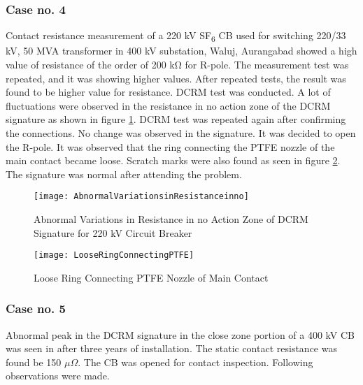 \subsubsection*{Case no. 4}
Contact resistance measurement of a 220 kV SF\textsubscript{6} CB used for switching 220/33 kV, 50 MVA transformer in 400 kV substation, Waluj, Aurangabad showed a high value of resistance of the order of 200 kΩ for R-pole. The measurement test was repeated, and it was showing higher values. After repeated tests, the result was found to be higher value for resistance. DCRM test was conducted. A lot of fluctuations were observed in the resistance in no action zone of the DCRM signature as shown in figure \ref{fig:Abnormal Variations in Resistance in no Action Zone of DCRM Signature for 220 kV Circuit Breaker}. DCRM test was repeated again after confirming the connections. No change was observed in the signature. It was decided to open the R-pole. It was observed that the ring connecting the PTFE nozzle of the main contact became loose. Scratch marks were also found as seen in figure \ref{fig:Loose Ring Connecting PTFE Nozzle of Main Contact}. The signature was normal after attending the problem.

\begin{figure}[!htbp]
    \centering
    \texttt{[image: AbnormalVariationsinResistanceinno]}
    \caption{Abnormal Variations in Resistance in no Action Zone of DCRM Signature for 220 kV Circuit Breaker}
    \label{fig:Abnormal Variations in Resistance in no Action Zone of DCRM Signature for 220 kV Circuit Breaker}
\end{figure}

\begin{figure}[!htbp]
    \centering
    \texttt{[image: LooseRingConnectingPTFE]}
    \caption{Loose Ring Connecting PTFE Nozzle of Main Contact}
    \label{fig:Loose Ring Connecting PTFE Nozzle of Main Contact}
\end{figure}

\subsubsection*{Case no. 5}
Abnormal peak in the DCRM signature in the close zone portion of a 400 kV CB was seen in after three years of installation. The static contact resistance was found be 150 $\mu \Omega$. The CB was opened for contact inspection. Following observations were made.

